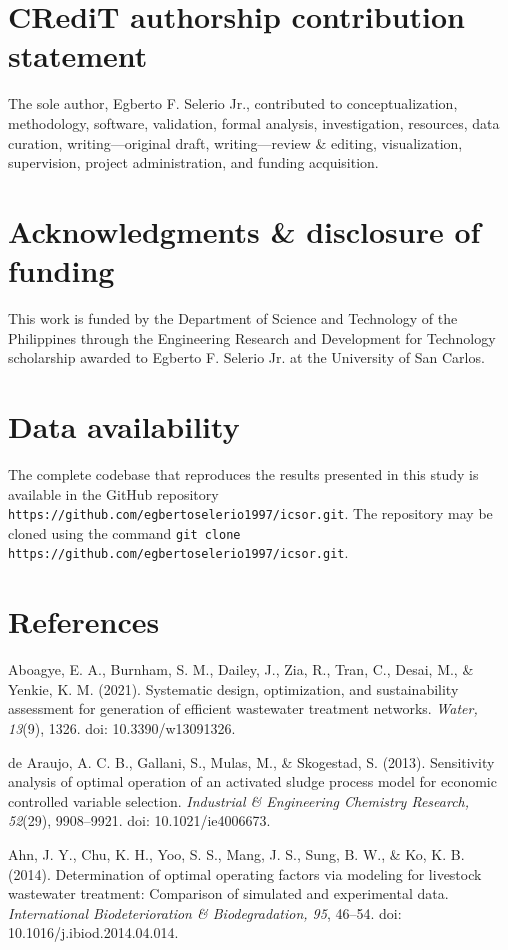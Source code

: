 \documentclass[a4paper,fleqn]{cas-sc}
\begin{document}
\section*{CRediT authorship contribution statement}

The sole author, Egberto F. Selerio Jr., contributed to conceptualization, methodology, software, validation, formal analysis, investigation, resources, data curation, writing---original draft, writing---review \& editing, visualization, supervision, project administration, and funding acquisition.

\section*{Acknowledgments \& disclosure of funding}

This work is funded by the Department of Science and Technology of the Philippines through the Engineering Research and Development for Technology scholarship awarded to Egberto F. Selerio Jr. at the University of San Carlos.

\section*{Data availability}

The complete codebase that reproduces the results presented in this study is available in the GitHub repository \texttt{https://github.com/egbertoselerio1997/icsor.git}. The repository may be cloned using the command \texttt{git clone https://github.com/egbertoselerio1997/icsor.git}.

\section*{References}

\noindent Aboagye, E. A., Burnham, S. M., Dailey, J., Zia, R., Tran, C., Desai, M., \& Yenkie, K. M. (2021). Systematic design, optimization, and sustainability assessment for generation of efficient wastewater treatment networks. \textit{Water, 13}(9), 1326. doi: 10.3390/w13091326.

\noindent de Araujo, A. C. B., Gallani, S., Mulas, M., \& Skogestad, S. (2013). Sensitivity analysis of optimal operation of an activated sludge process model for economic controlled variable selection. \textit{Industrial \& Engineering Chemistry Research, 52}(29), 9908--9921. doi: 10.1021/ie4006673.

\noindent Ahn, J. Y., Chu, K. H., Yoo, S. S., Mang, J. S., Sung, B. W., \& Ko, K. B. (2014). Determination of optimal operating factors via modeling for livestock wastewater treatment: Comparison of simulated and experimental data. \textit{International Biodeterioration \& Biodegradation, 95}, 46--54. doi: 10.1016/j.ibiod.2014.04.014.
\end{document}
